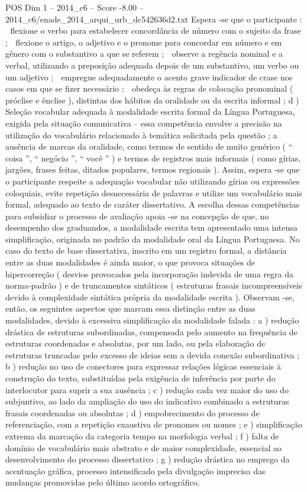 \begin{textsample}{POS Dim 1 – 2014\_c6 – Score -8.00 – 2014\_c6/enade\_2014\_arqui\_urb\_dc542636d2.txt}
Espera -se que o participante :  flexione o verbo para estabelecer concordância de número com o sujeito da frase ;  flexione o artigo, o adjetivo e o pronome para concordar em número e em gênero com o substantivo a que se referem ;  observe a regência nominal e a verbal, utilizando a preposição adequada depois de um substantivo, um verbo ou um adjetivo ;  empregue adequadamente o acento grave indicador de crase nos casos em que se fizer necessário ;  obedeça às regras de colocação pronominal ( próclise e ênclise ), distintas dos hábitos da oralidade ou da escrita informal ; d ) Seleção vocabular adequada à modalidade escrita formal da Língua Portuguesa, exigida pela situação comunicativa – essa competência envolve a precisão na utilização do vocabulário relacionado à temática solicitada pela questão ; a ausência de marcas da oralidade, como termos de sentido de muito genérico ( “ coisa ”, “ negócio ”, “ você ” ) e termos de registros mais informais ( como gírias, jargões, frases feitas, ditados populares, termos regionais ).
Assim, espera -se que o participante respeite a adequação vocabular não utilizando gírias ou expressões coloquiais, evite repetição desnecessária de palavras e utilize um vocabulário mais formal, adequado ao texto de caráter dissertativo.
A escolha dessas competências para subsidiar o processo de avaliação apoia -se na concepção de que, no desempenho dos graduandos, a modalidade escrita tem apresentado uma intensa simplificação, originada no padrão da modalidade oral da Língua Portuguesa.
No caso do texto de base dissertativa, inscrito em um registro formal, a distância entre as duas modalidades é ainda maior, o que provoca situações de hipercorreção ( desvios provocados pela incorporação indevida de uma regra da norma-padrão ) e de truncamentos sintáticos ( estruturas frasais incompreensíveis devido à complexidade sintática própria da modalidade escrita ).
Observam -se, então, os seguintes aspectos que marcam essa distinção entre as duas modalidades, devido à excessiva simplificação da modalidade falada : a ) redução drástica de estruturas subordinadas, compensada pelo aumento na frequência de estruturas coordenadas e absolutas, por um lado, ou pela elaboração de estruturas truncadas pelo excesso de ideias sem a devida conexão subordinativa ; b ) redução no uso de conectores para expressar relações lógicas essenciais à construção do texto, substituídas pela exigência de inferência por parte do interlocutor para suprir a sua ausência ; c ) redução cada vez maior do uso do subjuntivo, ao lado da ampliação do uso do indicativo combinado a estruturas frasais coordenadas ou absolutas ; d ) empobrecimento do processo de referenciação, com a repetição exaustiva de pronomes ou nomes ; e ) simplificação extrema da marcação da categoria tempo na morfologia verbal ; f ) falta de domínio de vocabulário mais abstrato e de maior complexidade, essencial ao desenvolvimento do processo dissertativo ; g ) redução drástica no emprego da acentuação gráfica, processo intensificado pela divulgação imprecisa das mudanças promovidas pelo último acordo ortográfico.

\end{textsample}

